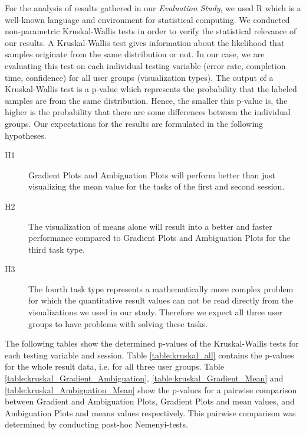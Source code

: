 For the analysis of results gathered in our \textit{Evaluation Study}, we used R \cite{REnvironment} which is a well-known language and environment for statistical computing. We conducted non-parametric Kruskal-Wallis tests \cite{kruskal1952use} in order to verify the statistical relevance of our results. A Kruskal-Wallis test gives information about the likelihood that samples originate from the same distribution or not. In our case, we are evaluating this test on each individual testing variable (error rate, completion time, confidence) for all user groups (visualization types). The output of a Kruskal-Wallis test is a p-value which represents the probability that the labeled samples are from the same distribution. Hence, the smaller this p-value is, the higher is the probability that there are some differences between the individual groups. Our expectations for the results are formulated in the following hypotheses.

\begin{description}
\item[H1] Gradient Plots and Ambiguation Plots will perform better than just visualizing the mean value for the tasks of the first and second session.
\item[H2] The visualization of means alone will result into a better and faster performance compared to Gradient Plots and Ambiguation Plots for the third task type.
\item[H3] The fourth task type represents a mathematically more complex problem for which the quantitative result values can not be read directly from the visualizations we used in our study. Therefore we expect all three user groups to have problems with solving these tasks.
\end{description}

The following tables show the determined p-values of the Kruskal-Wallis tests for each testing variable and session. Table \ref{table:kruskal_all} contains the p-values for the whole result data, i.e. for all three user groups. Table \ref{table:kruskal_Gradient_Ambiguation}, \ref{table:kruskal_Gradient_Mean} and \ref{table:kruskal_Ambiguation_Mean} show the p-values for a pairwise comparison between Gradient and Ambiguation Plots, Gradient Plots and mean values, and Ambiguation Plots and means values respectively. This pairwise comparison was determined by conducting post-hoc Nemenyi-tests.


